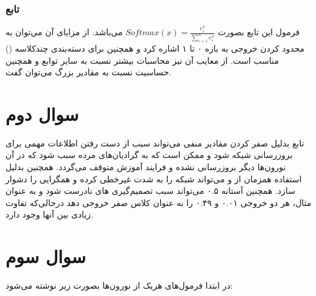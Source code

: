 \documentclass[12pt]{article}
\begin{document}
	\subsubsection{تابع }
	فرمول این تابع بصورت $Softmax(x) = \frac{e^{x}_{i}}{\sum_{i=1}^{n} e_{i}^{x}}$ می‌باشد. از مزایای آن می‌توان به محدود کردن خروجی به بازه ۰ تا ۱ اشاره کرد و همچنین برای دسته‌بندی چندکلاسه () مناسب است. از معایب آن نیز محاسبات بیشتر نسبت به سایر توابع و همچنین حساسیت نسبت به مقادیر بزرگ می‌توان گفت.
	\section{سوال دوم}
	تابع  بدلیل صفر کردن مقادیر منفی می‌تواند سبب از دست رفتن اطلاعات مهمی برای بروزرسانی شبکه شود و ممکن است که به گرادیان‌های مرده سبب شود که در آن نورون‌ها دیگر بروزرسانی نشده و فرایند آموزش متوقف می‌گردد. همچنین بدلیل استفاده همزمان از  و  می‌تواند شبکه را به شدت غیرخطی کرده و همگرایی را دشوار سازد. همچنین آستانه ۰.۵ می‌تواند سبب تصمیم‌گیری های نادرست شود و به عنوان مثال، هر دو خروجی ۰.۰۱ و ۰.۴۹ را به عنوان کلاس صفر خروجی دهد درحالی‌که تفاوت زیادی بین آنها وجود دارد.
	\section{سوال سوم}
	در ابتدا فرمول‌های هریک از نورون‌ها بصورت زیر نوشته می‌شود:
	
\end{document}
